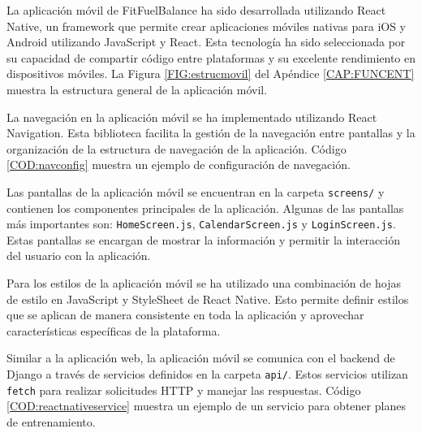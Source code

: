 La aplicación móvil  de FitFuelBalance ha sido desarrollada utilizando React Native, un framework que permite crear aplicaciones móviles nativas para iOS y Android utilizando JavaScript y React. Esta tecnología ha sido seleccionada por su capacidad de compartir código entre plataformas y su excelente rendimiento en dispositivos móviles. La Figura \ref{FIG:estrucmovil} del Apéndice \ref{CAP:FUNCENT} muestra la estructura general de la aplicación móvil.

La navegación  en la aplicación móvil se ha implementado utilizando React Navigation. Esta biblioteca facilita la gestión de la navegación entre pantallas y la organización de la estructura de navegación de la aplicación. Código \ref{COD:navconfig} muestra un ejemplo de configuración de navegación.

Las pantallas de la aplicación móvil se encuentran en la carpeta \texttt{screens/}  y contienen los componentes principales de la aplicación. Algunas de las pantallas más importantes son: \texttt{HomeScreen.js}, \texttt{CalendarScreen.js} y \texttt{LoginScreen.js}. Estas pantallas se encargan de mostrar la información y permitir la interacción del usuario con la aplicación.

Para los estilos  de la aplicación móvil se ha utilizado una combinación de hojas de estilo en JavaScript y StyleSheet de React Native. Esto permite definir estilos que se aplican de manera consistente en toda la aplicación y aprovechar características específicas de la plataforma.

Similar a la aplicación web, la aplicación móvil se comunica con el backend de Django a través de servicios definidos en la carpeta \texttt{api/}. Estos servicios utilizan \texttt{fetch}  para realizar solicitudes HTTP y manejar las respuestas. Código \ref{COD:reactnativeservice} muestra un ejemplo de un servicio para obtener planes de entrenamiento.